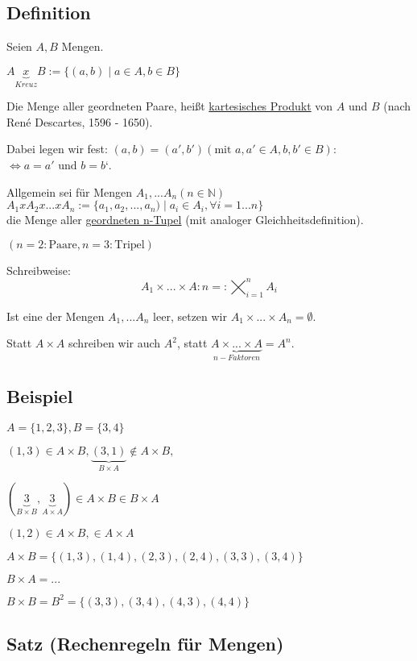 \documentclass[a4paper, 12pt, twoside] {article}
\begin{document}
\subsection{Definition}
Seien $A, B$ Mengen.

$A \underbrace{x}_{Kreuz} B := \{(a, b) \mid a \in A, b \in B\}$

Die Menge aller geordneten Paare, heißt \underline{kartesisches Produkt} von $A$ und $B$ (nach René Descartes, 1596 - 1650).

Dabei legen wir fest: $(a, b) = (a', b') (\text{mit } a, a' \in A, b, b' \in B):$ \\
$\Leftrightarrow a = a' \text{ und } b = b‘$.

Allgemein sei für Mengen $A_1, ... A_n (n \in \mathbb{N})$ \\
$A_1 x A_2 x ... x A_n := \{a_1, a_2, ..., a_n) \mid a_i \in A_i, \forall i = 1 ... n\}$ \\
die Menge aller \underline{geordneten n-Tupel} (mit analoger Gleichheitsdefinition).

$(n = 2: \text{Paare}, n = 3: \text{Tripel})$

Schreibweise: \\
$$A_1 \times ... \times A:n =: \bigtimes_{i=1}^{n} A_i$$

Ist eine der Mengen $A_1, ... A_n$ leer, setzen wir $A_1 \times ... \times A_n = \emptyset$.

Statt $A \times A$ schreiben wir auch $A^2$, statt $\underbrace{A \times ... \times A}_{n-Faktoren} = A^n$.


\subsection{Beispiel}
$A = \{1, 2, 3\}, B = \{3, 4\}$

$(1, 3) \in A \times B, \underbrace{(3, 1)}_{B \times A} \notin A \times B,$

$(\underbrace{3}_{B \times B}, \underbrace{3}_{A \times A}) \in A \times B\in B \times A$

$(1, 2) \in A \times B, \in A \times A$

$A \times B = \{(1, 3), (1, 4), (2, 3), (2, 4), (3, 3), (3, 4)\}$

$B \times A = ...$

$B \times B = B^2 = \{(3, 3), (3, 4), (4, 3), (4, 4)\}$


\subsection{Satz (Rechenregeln für Mengen)}
\end{document}
